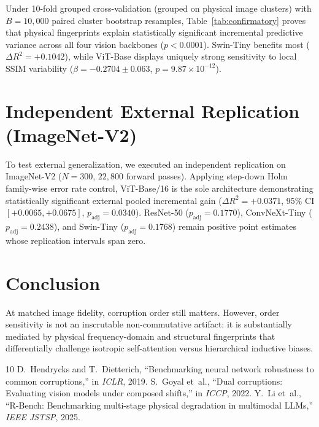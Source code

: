 \documentclass[10pt,journal,compsoc]{IEEEtran}
\begin{document}
Under 10-fold grouped cross-validation (grouped on physical image clusters) with $B = 10{,}000$ paired cluster bootstrap resamples, Table~\ref{tab:confirmatory} proves that physical fingerprints explain statistically significant incremental predictive variance across all four vision backbones ($p < 0.0001$). Swin-Tiny benefits most ($\Delta R^2 = +0.1042$), while ViT-Base displays uniquely strong sensitivity to local SSIM variability ($\beta = -0.2704 \pm 0.063$, $p = 9.87 \times 10^{-12}$).

\section{Independent External Replication (ImageNet-V2)}
To test external generalization, we executed an independent replication on ImageNet-V2 ($N = 300$, $22{,}800$ forward passes). Applying step-down Holm family-wise error rate control, ViT-Base/16 is the sole architecture demonstrating statistically significant external pooled incremental gain ($\Delta R^2 = +0.0371$, 95\% CI $[+0.0065, +0.0675]$, $p_{\text{adj}} = 0.0340$). ResNet-50 ($p_{\text{adj}} = 0.1770$), ConvNeXt-Tiny ($p_{\text{adj}} = 0.2438$), and Swin-Tiny ($p_{\text{adj}} = 0.1768$) remain positive point estimates whose replication intervals span zero.

\section{Conclusion}
At matched image fidelity, corruption order still matters. However, order sensitivity is not an inscrutable non-commutative artifact: it is substantially mediated by physical frequency-domain and structural fingerprints that differentially challenge isotropic self-attention versus hierarchical inductive biases.

\begin{thebibliography}{10}
D.~Hendrycks and T.~Dietterich, ``Benchmarking neural network robustness to common corruptions,'' in \emph{ICLR}, 2019.
S.~Goyal et~al., ``Dual corruptions: Evaluating vision models under composed shifts,'' in \emph{ICCP}, 2022.
Y.~Li et~al., ``R-Bench: Benchmarking multi-stage physical degradation in multimodal LLMs,'' \emph{IEEE JSTSP}, 2025.
\end{thebibliography}
\end{document}
